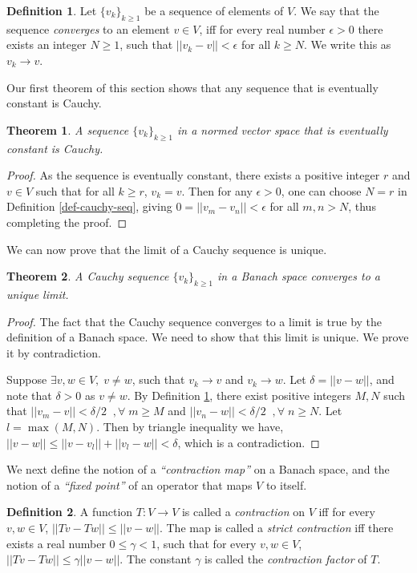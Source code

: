 \documentclass{article}
\newtheorem{theorem}{Theorem}[section]
\theoremstyle{definition}
\newtheorem{definition}{Definition}[section]
\theoremstyle{remark}
\begin{document}
\begin{definition}
Let $\{v_k\}_{k \geq 1}$ be a sequence of elements of $V$. We say that the sequence \textit{converges} to an element $v \in V$, iff for every real number $\epsilon > 0$ there exists an integer $N \geq 1$, such that $||v_k - v|| < \epsilon$ for all $k \geq N$. We write this as $v_k \rightarrow v$.
\label{def-convergence}
\end{definition}

Our first theorem of this section shows that any sequence that is eventually constant is Cauchy.
\begin{theorem}
A sequence $\{v_k\}_{k \geq 1}$ in a normed vector space that is eventually constant is Cauchy.
\label{th-eventually-const-seq}
\end{theorem}

\begin{proof}
As the sequence is eventually constant, there exists a positive integer $r$ and $v \in V$ such that for all $k \geq r$, $v_k = v$. Then for any $\epsilon > 0$, one can choose $N = r$ in Definition \ref{def-cauchy-seq}, giving $0 = ||v_m - v_n|| < \epsilon$ for all $m,n > N$, thus completing the proof.
\end{proof}

We can now prove that the limit of a Cauchy sequence is unique.
\begin{theorem}
A Cauchy sequence $\{v_k\}_{k \geq 1}$ in a Banach space converges to a unique limit.
\label{th-cauchy-seq-lim}
\end{theorem}

\begin{proof}
The fact that the Cauchy sequence converges to a limit is true by the definition of a Banach space. We need to show that this limit is unique. We prove it by contradiction.

Suppose $\exists v,w \in V, \; v \neq w$, such that $v_k \rightarrow v$ and $v_k \rightarrow w$. Let $\delta = ||v-w||$, and note that $\delta > 0$ as $v \neq w$. By Definition \ref{def-convergence}, there exist positive integers $M,N$ such that $||v_m - v|| < \delta/2 \;\;, \forall \; m \geq M$ and $||v_n - w|| < \delta/2 \;\;, \forall \; n \geq N$. Let $l = \max(M,N)$. Then by triangle inequality we have, $||v - w|| \leq ||v - v_l|| + ||v_l - w|| < \delta$, which is a contradiction.
\end{proof}

We next define the notion of a \textit{``contraction map''} on a Banach space, and the notion of a \textit{``fixed point''} of an operator that maps $V$ to itself.
\begin{definition}
A function $T:V \rightarrow V$ is called a \textit{contraction} on $V$ iff for every $v,w \in V$, $||Tv - Tw|| \leq ||v - w||$. The map is called a \textit{strict contraction} iff there exists a real number $0 \leq \gamma < 1$, such that for every $v,w \in V$, $||Tv - Tw|| \leq \gamma ||v - w||$. The constant $\gamma$ is called the \textit{contraction factor} of $T$.
\label{def-contraction-map}
\end{definition}
\end{document}
